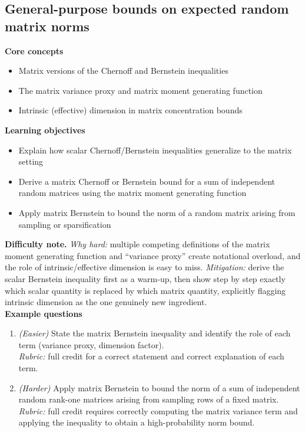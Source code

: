 \documentclass[11pt]{article}
\begin{document}
\subsection{General-purpose bounds on expected random matrix norms}
\textbf{Core concepts}
\begin{itemize}[nosep]
\item Matrix versions of the Chernoff and Bernstein inequalities
\item The matrix variance proxy and matrix moment generating function
\item Intrinsic (effective) dimension in matrix concentration bounds
\end{itemize}
\textbf{Learning objectives}
\begin{itemize}[nosep]
\item Explain how scalar Chernoff/Bernstein inequalities generalize to the matrix setting
\item Derive a matrix Chernoff or Bernstein bound for a sum of independent random matrices using the matrix moment generating function
\item Apply matrix Bernstein to bound the norm of a random matrix arising from sampling or sparsification
\end{itemize}
\textbf{Difficulty note.} \emph{Why hard:} multiple competing definitions of the matrix moment generating function and ``variance proxy'' create notational overload, and the role of intrinsic/effective dimension is easy to miss. \emph{Mitigation:} derive the scalar Bernstein inequality first as a warm-up, then show step by step exactly which scalar quantity is replaced by which matrix quantity, explicitly flagging intrinsic dimension as the one genuinely new ingredient.\\[4pt]
\textbf{Example questions}
\begin{enumerate}[nosep]
\item \emph{(Easier)} State the matrix Bernstein inequality and identify the role of each term (variance proxy, dimension factor). \\
\emph{Rubric:} full credit for a correct statement and correct explanation of each term.
\item \emph{(Harder)} Apply matrix Bernstein to bound the norm of a sum of independent random rank-one matrices arising from sampling rows of a fixed matrix. \\
\emph{Rubric:} full credit requires correctly computing the matrix variance term and applying the inequality to obtain a high-probability norm bound.
\end{enumerate}
\end{document}

